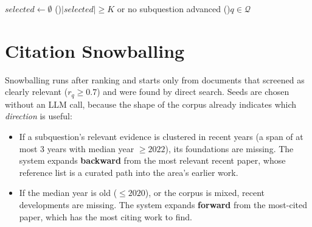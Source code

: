 \documentclass[10pt,a4paper]{article}
\begin{document}
\begin{algorithm}[t]
\caption{Round-robin reading allocation}
\label{alg:select}
$\mathit{selected}\leftarrow\emptyset$\;
\Repeat(){$|\mathit{selected}|\ge K$ or no subquestion advanced}{
}
\ForEach(){$q\in\mathcal{Q}$}{
}
\;
\end{algorithm}

\section{Citation Snowballing}
\label{sec:snowball}

Snowballing runs after ranking and starts only from documents that screened
as clearly relevant ($r_q\ge 0.7$) and were found by direct search. Seeds
are chosen without an LLM call, because the shape of the corpus already
indicates which \emph{direction} is useful:

\begin{itemize}[leftmargin=*]
  \item If a subquestion's relevant evidence is clustered in recent years
    (a span of at most 3 years with median year $\ge 2022$), its
    foundations are missing. The system expands \textbf{backward} from the
    most relevant recent paper, whose reference list is a curated path into
    the area's earlier work.
  \item If the median year is old ($\le 2020$), or the corpus is mixed,
    recent developments are missing. The system expands \textbf{forward}
    from the most-cited paper, which has the most citing work to find.
\end{itemize}
\end{document}
